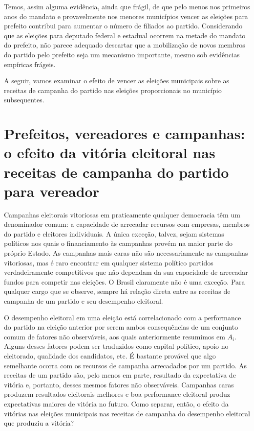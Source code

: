Temos, assim alguma evidência, ainda que frágil, de que pelo menos nos primeiros anos do mandato e provavelmente nos menores municípios vencer as eleições para prefeito contribui para aumentar o número de filiados ao partido. Considerando que as eleições para deputado federal e estadual ocorrem na metade do mandato do prefeito, não parece adequado descartar que a mobilização de novos membros do partido pelo prefeito seja um mecanismo importante, mesmo sob evidências empíricas frágeis.

A seguir, vamos examinar o efeito de vencer as eleições municipais sobre as receitas de campanha do partido nas eleições proporcionais no município subsequentes.

\section{Prefeitos, vereadores e campanhas: o efeito da vitória eleitoral nas receitas de campanha do partido para vereador}

Campanhas eleitorais vitoriosas em praticamente qualquer democracia têm um denominador comum: a capacidade de arrecadar recursos com empresas, membros do partido e eleitores individuais. A única exceção, talvez, sejam sistemas políticos nos quais o financiamento às campanhas provém na maior parte do próprio Estado. As campanhas mais caras não são necessariamente as campanhas vitoriosas, mas é raro encontrar em qualquer sistema político partidos verdadeiramente competitivos que não dependam da sua capacidade de arrecadar fundos para competir nas eleições. O Brasil claramente não é uma exceção. Para qualquer cargo que se observe, sempre há relação direta entre as receitas de campanha de um partido e seu desempenho eleitoral.

O desempenho eleitoral em uma eleição está correlacionado com a performance do partido na eleição anterior por serem ambos consequências de um conjunto comum de fatores não observáveis, aos quais anteriormente resumimos em $A_{i}$. Alguns desses fatores podem ser traduzidos como capital político, apoio no eleitorado, qualidade dos candidatos, etc. É bastante provável que algo semelhante ocorra com os recursos de campanha arrecadados por um partido. As receitas de um partido são, pelo menos em parte, resultado da expectativa de vitória e, portanto, desses mesmos fatores não observáveis. Campanhas caras produzem resultados eleitorais melhores e boa performance eleitoral produz expectativas maiores de vitória no futuro. Como separar, então, o efeito da vitórias nas eleições municipais nas receitas de campanha do desempenho eleitoral que produziu a vitória?

